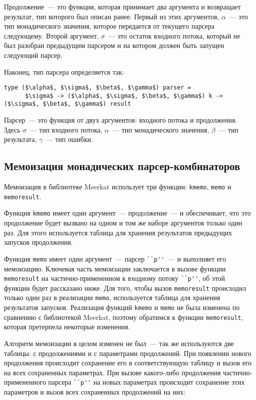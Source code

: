\documentclass[conference]{IEEEtran}
\begin{document}
Продолжение~--- это функция, которая принимает два аргумента и возвращает результат, тип которого был описан ранее. Первый из этих аргументов, $\alpha$~--- это тип монадического значения,
которое передается от текущего парсера следующему. Второй аргумент, $\sigma$~--- это остаток входного потока, который не был разобран предыдущим парсером и на котором должен быть
запущен следующий парсер.

Наконец, тип парсера определяется так:

\begin{lstlisting}[basicstyle=\small]
   type ($\alpha$, $\sigma$, $\beta$, $\gamma$) parser =
      $\sigma$ -> ($\alpha$, $\sigma$, $\beta$, $\gamma$) k -> ($\sigma$, $\beta$, $\gamma$) result
\end{lstlisting}

Парсер~--- это функция от двух аргументов: входного потока и продолжения. Здесь $\sigma$~--- тип входного потока, $\alpha$~--- тип монадического значения, $\beta$~--- тип результата, $\gamma$~---
тип ошибки.

\subsection{Мемоизация монадических парсер-комбинаторов}

Мемоизация в библиотеке Meerkat использует три функции: \lstinline|kmemo|, \lstinline|memo| и \lstinline|memoresult|.

Функция \lstinline|kmemo| имеет один аргумент~--- продолжение~--- и обеспечивает, что это продолжение будет вызвано на одном и том же наборе аргументов только один раз. Для этого используется
таблица для хранения результатов предыдущих запусков продолжения.

Функция \lstinline|memo| имеет один аргумент~--- парсер \lstinline|``p''|~--- и выполняет его мемоизацию. Ключевая часть мемоизации заключается в вызове функции \lstinline|memoresult| на
частично-примененном к входному потоку \lstinline|``p''|, об этой функции будет рассказано ниже. Для того, чтобы вызов \lstinline|memoresult| происходил только один раз в
реализации \lstinline|memo|, используется таблица для хранения результатов запусков. Реализация функций \lstinline|kmemo| и \lstinline|memo| не была изменена по сравнению с
библиотекой Meerkat, поэтому обратимся к функции \lstinline|memoresult|, которая претерпела некоторые изменения.

Алгоритм мемоизации в целом изменен не был~--- так же используются две таблицы: с продолжениями и с параметрами продолжений. При появлении нового продолжения происходит сохранение
его в соответствующую таблицу и вызов его на всех сохраненных параметрах. При вызове какого-либо продолжения частично-примененного парсера \lstinline|``p''| на новых параметрах происходит сохранение этих
параметров и вызов всех сохраненных продолжений на них:
\end{document}
